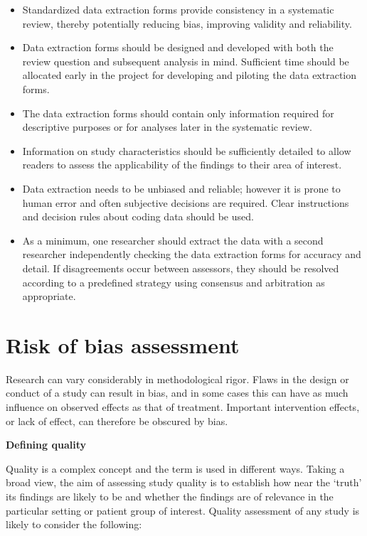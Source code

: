 \documentclass[
  10pt,
  a4paper,
  DIV=11,
  numbers=noendperiod]{scrreprt}
\begin{document}
\begin{itemize}
\item
  Standardized data extraction forms provide consistency in a systematic
  review, thereby potentially reducing bias, improving validity and
  reliability.
\item
  Data extraction forms should be designed and developed with both the
  review question and subsequent analysis in mind. Sufficient time
  should be allocated early in the project for developing and piloting
  the data extraction forms.
\item
  The data extraction forms should contain only information required for
  descriptive purposes or for analyses later in the systematic review.
\item
  Information on study characteristics should be sufficiently detailed
  to allow readers to assess the applicability of the findings to their
  area of interest.
\item
  Data extraction needs to be unbiased and reliable; however it is prone
  to human error and often subjective decisions are required. Clear
  instructions and decision rules about coding data should be used.
\item
  As a minimum, one researcher should extract the data with a second
  researcher independently checking the data extraction forms for
  accuracy and detail. If disagreements occur between assessors, they
  should be resolved according to a predefined strategy using consensus
  and arbitration as appropriate.
\end{itemize}

\section{Risk of bias assessment}\label{risk-of-bias-assessment-1}

Research can vary considerably in methodological rigor. Flaws in the
design or conduct of a study can result in bias, and in some cases this
can have as much influence on observed effects as that of treatment.
Important intervention effects, or lack of effect, can therefore be
obscured by bias.

\textbf{Defining quality}

Quality is a complex concept and the term is used in different ways.
Taking a broad view, the aim of assessing study quality is to establish
how near the `truth' its findings are likely to be and whether the
findings are of relevance in the particular setting or patient group of
interest. Quality assessment of any study is likely to consider the
following:
\end{document}
